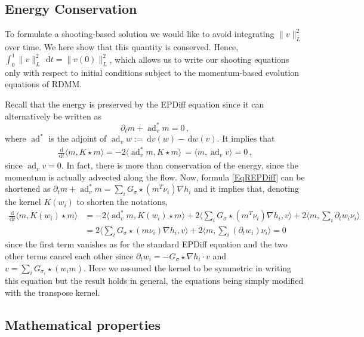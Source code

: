 \documentclass{article}
\numberwithin{equation}{section}
\let\on=\operatorname
\newcommand{\ud}{\,\mathrm{d}}
\begin{document}
\subsection{Energy Conservation}
\label{sec:energy_conservation}

To formulate a shooting-based solution we would like to avoid integrating $\|v\|_L^2$ over time. We here show that this quantity is conserved. Hence, $\int_0^1 \|v\|_L^2~\ud t=\|v(0)\|_L^2$, which allows us to write our shooting equations only with respect to initial conditions subject to the momentum-based evolution equations of RDMM.

Recall that the energy is preserved by the EPDiff equation since it can alternatively be written as 
\begin{equation}
    \partial_t m + \on{ad}_{v}^*m = 0\,,
\end{equation}
where $\on{ad}^*$ is the adjoint of $\on{ad}_v w := \ud v(w) - \ud w(v)$.
It implies that 
\begin{align*}
  \frac{\ud }{\ud t}  \langle m,K \star m\rangle =- 2 \langle \on{ad}_{v}^*m,K\star m\rangle\, = \langle m,\on{ad}_v v\rangle = 0\,,
\end{align*}
since $\on{ad}_v v = 0$. In fact, there is more than conservation of the energy, since the momentum is actually advected along the flow. Now, formula \eqref{EqREPDiff} can be shortened as $\partial_t m + \on{ad}_{v}^*m = \sum_i G_\sigma \star (m^T \nu_i) \nabla h_i$ and it implies that, denoting the kernel $K(w_i)$ to shorten the notations,
\begin{align*}
  \frac{\ud }{\ud t}  \langle m,K(w_i) \star m\rangle &=- 2 \langle \on{ad}_{v}^*m,K(w_i)\star m\rangle + 2\langle \sum_i G_\sigma \star  (m^T \nu_i) \nabla h_i,v\rangle + 2\langle m,\sum_i \partial_t w_i \nu_i\rangle \\
  & = 2\langle \sum_i G_\sigma \star (m \nu_i) \nabla h_i,v\rangle + 2\langle m ,\sum_i (\partial_t w_i) \nu_i\rangle = 0
\end{align*}
since the first term vanishes as for the standard EPDiff equation and the two other terms cancel each other since $\partial_t w_i = -G_\sigma \star \nabla h_i \cdot v$ and $v = \sum_i G_{\sigma_i} \star (w_i m)$. Here we assumed the kernel to be symmetric in writing this equation but the result holds in general, the equations being simply modified with the transpose kernel.

\subsection{Mathematical properties}
\label{sec:mathematical_properties}
\end{document}
